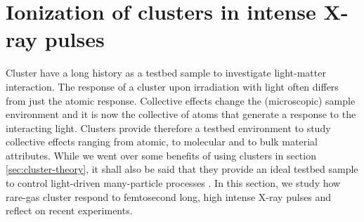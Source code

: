 \section{Ionization of clusters in intense X-ray pulses}\label{sec:ionizatin-of-ext-obj}
Cluster have a long history as a testbed sample to investigate light-matter interaction. The response of a cluster upon irradiation with light often differs from just the atomic response. Collective effects change the (microscopic) sample environment and it is now the collective of atoms that generate a response to the interacting light. Clusters provide therefore a testbed environment to study collective effects ranging from atomic, to molecular and to bulk material attributes. While we went over some benefits of using clusters in section \ref{sec:cluster-theory}, it shall also be said that they provide an ideal testbed sample to control light-driven many-particle processes \citep{Fennel-2010-RMP}. In this section, we study how rare-gas cluster respond to femtosecond long, high intense X-ray pulses and reflect on recent experiments.
%
%
%

